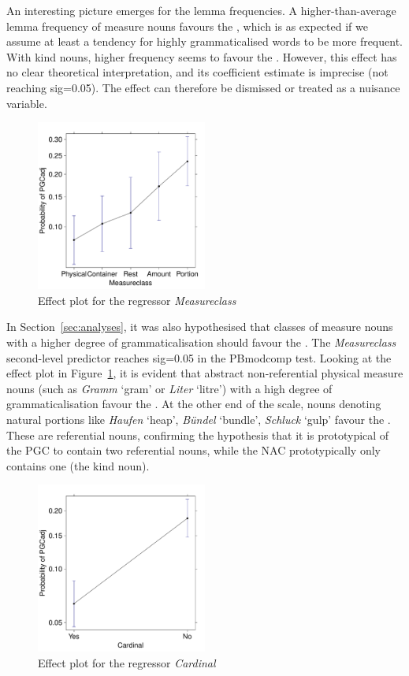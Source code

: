 An interesting picture emerges for the lemma frequencies.
A higher-than-average lemma frequency of measure nouns favours the \NACa, which is as expected if we assume at least a tendency for highly grammaticalised words to be more frequent.
With kind nouns, higher frequency seems to favour the \PGCa.
However, this effect has no clear theoretical interpretation, and its coefficient estimate is imprecise (not reaching sig=0.05).
The effect can therefore be dismissed or treated as a nuisance variable.


\begin{figure}[h!]
  \centering
  \includegraphics[width=0.5\textwidth]{../R/output/corpus_Measureclass}
  \caption{Effect plot for the regressor \textit{Measureclass}}
  \label{fig:eff:measureattraction}
\end{figure}

In Section~\ref{sec:analyses}, it was also hypothesised that classes of measure nouns with a higher degree of grammaticalisation should favour the \NACa.
The \textit{Measureclass} second-level predictor reaches sig=0.05 in the PBmodcomp test.
Looking at the effect plot in Figure~\ref{fig:eff:measureattraction}, it is evident that abstract non-referential physical measure nouns (such as \textit{Gramm} `gram' or \textit{Liter} `litre') with a high degree of grammaticalisation favour the \NACa.
At the other end of the scale, nouns denoting natural portions like \textit{Haufen} `heap', \textit{Bündel} `bundle', \textit{Schluck} `gulp' favour the \PGCa.
These are referential nouns, confirming the hypothesis that it is prototypical of the PGC to contain two referential nouns, while the NAC prototypically only contains one (the kind noun).

\begin{figure}[h!]
  \centering
  \includegraphics[width=0.5\textwidth]{../R/output/corpus_Cardinal}
  \caption{Effect plot for the regressor \textit{Cardinal}}
  \label{fig:eff:leftcontext}
\end{figure}

